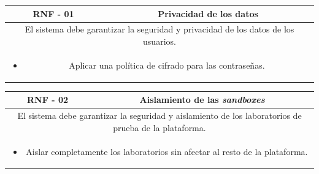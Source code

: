             \begin{table}[!htbp]
                \centering
                \begin{tabular}{|c|c|}
                    \hline
                    \textbf{RNF - 01} & \textbf{Privacidad de los datos} \\
                    \hline
                    \multicolumn{2}{|p{15cm}|}{
                        El sistema debe garantizar la seguridad y privacidad de los datos de los usuarios.
                    } \\
                    \hline
                    \multicolumn{2}{|p{15cm}|}{
                        \begin{itemize}
                            \item Aplicar una política de cifrado para las contraseñas.
                        \end{itemize}
                        } \\
                    \hline
                \end{tabular}
                \label{tab:RNF1}
            \end{table}
            
            \begin{table}[!htbp]
                \centering
                \begin{tabular}{|c|c|}
                    \hline
                    \textbf{RNF - 02} & \textbf{Aislamiento de las \textit{sandboxes}} \\
                    \hline
                    \multicolumn{2}{|p{15cm}|}{
                        El sistema debe garantizar la seguridad y aislamiento de los laboratorios de prueba de la plataforma.
                    } \\
                    \hline
                    \multicolumn{2}{|p{15cm}|}{
                        \begin{itemize}
                            \item Aislar completamente los laboratorios sin afectar al resto de la plataforma.
                        \end{itemize}
                        } \\
                    \hline
                \end{tabular}
                \label{tab:RNF2}
            \end{table}
            
